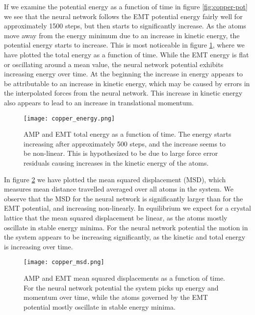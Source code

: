 If we examine the potential energy as a function of time
in figure \ref{fig:copper-pot} we see that the neural network
follows the EMT potential energy fairly well for approximately
1500 steps, but then starts to significantly increase.
As the atoms move away from the energy minimum due to an increase
in kinetic energy, the potential energy starts to increase.
This is most noticeable in figure \ref{fig:copper-energy},
where we have plotted the total energy as a function of time.
While the EMT energy is flat or oscillating around a mean value,
the neural network potential exhibits increasing energy over time.
At the beginning the increase in energy appears to be attributable
to an increase in kinetic energy, which may be caused by errors
in the interpolated forces from the neural network.
This increase in kinetic energy also appears to lead to an increase
in translational momentum.

\begin{figure}[H]
    \centering
    \texttt{[image: copper\_energy.png]}
    \caption{AMP and EMT total energy as a function of time.
    The energy starts increasing after approximately 500 steps,
    and the increase seems to be non-linear. This is hypothesized
    to be due to large force error residuals causing increases in
    the kinetic energy of the atoms.}
    \label{fig:copper-energy}
\end{figure}

In figure \ref{fig:copper-msd} we have plotted the mean squared
displacement (MSD), 
which measures mean distance travelled averaged over all atoms in the system.
We observe that the MSD for the neural network is significantly larger
than for the EMT potential, and increasing non-linearly.
In equilibrium we expect for a crystal lattice
that the mean squared displacement be linear, as the atoms
mostly oscillate in stable energy minima.
For the neural network potential the motion in the system appears
to be increasing significantly, as the kinetic and total energy is increasing
over time.

\begin{figure}[H]
    \centering
    \texttt{[image: copper\_msd.png]}
    \caption{AMP and EMT mean squared displacements as a function of time.
        For the neural network potential the system picks up energy
        and momentum over time, while the atoms governed by the EMT
        potential mostly oscillate in stable energy minima.}
    \label{fig:copper-msd}
\end{figure}

